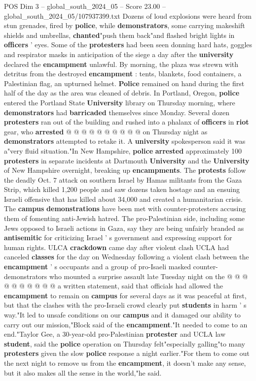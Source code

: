 \begin{textsample}{POS Dim 3 – global\_south\_2024\_05 – Score 23.00 – global\_south\_2024\_05/107937399.txt}
Dozens of loud explosions were heard from stun grenades, fired by \textbf{police}, while \textbf{demonstrators}, some carrying makeshift shields and umbrellas, \textbf{chanted}"push them back"and flashed bright lights in \textbf{officers} ' eyes.
Some of the \textbf{protesters} had been seen donning hard hats, goggles and respirator masks in anticipation of the siege a day after the \textbf{university} declared the \textbf{encampment} unlawful.
By morning, the plaza was strewn with detritus from the destroyed \textbf{encampment} : tents, blankets, food containers, a Palestinian flag, an upturned helmet. \textbf{Police} remained on hand during the first half of the day as the area was cleaned of debris.
In Portland, Oregon, \textbf{police} entered the Portland State \textbf{University} library on Thursday morning, where \textbf{demonstrators} had \textbf{barricaded} themselves since Monday.
Several dozen \textbf{protesters} ran out of the building and rushed into a phalanx of \textbf{officers} in \textbf{riot} gear, who \textbf{arrested} @ @ @ @ @ @ @ @ @ @ on Thursday night as \textbf{demonstrators} attempted to retake it.
A \textbf{university} spokesperson said it was a"very fluid situation."In New Hampshire, \textbf{police} \textbf{arrested} approximately 100 \textbf{protesters} in separate incidents at Dartmouth \textbf{University} and the \textbf{University} of New Hampshire overnight, breaking up \textbf{encampments}.
The \textbf{protests} follow the deadly Oct. 7 attack on southern Israel by Hamas militants from the Gaza Strip, which killed 1,200 people and saw dozens taken hostage and an ensuing Israeli offensive that has killed about 34,000 and created a humanitarian crisis.
The \textbf{campus} \textbf{demonstrations} have been met with counter-protesters accusing them of fomenting anti-Jewish hatred.
The pro-Palestinian side, including some Jews opposed to Israeli actions in Gaza, say they are being unfairly branded as \textbf{antisemitic} for criticizing Israel ' s government and expressing support for human rights.
ULCA \textbf{crackdown} came day after violent clash UCLA had canceled \textbf{classes} for the day on Wednesday following a violent clash between the \textbf{encampment} ' s occupants and a group of pro-Isaeli masked counter-demonstrators who mounted a surprise assault late Tuesday night on the @ @ @ @ @ @ @ @ @ @ a written statement, said that officials had allowed the \textbf{encampment} to remain on \textbf{campus} for several days as it was peaceful at first, but that the clashes with the pro-Israeli crowd clearly put \textbf{students} in harm ' s way."It led to unsafe conditions on our \textbf{campus} and it damaged our ability to carry out our mission,"Block said of the \textbf{encampment}."It needed to come to an end."Taylor Gee, a 30-year-old pro-Palestinian \textbf{protester} and UCLA law \textbf{student}, said the \textbf{police} operation on Thursday felt"especially galling"to many \textbf{protesters} given the slow \textbf{police} response a night earlier."For them to come out the next night to remove us from the \textbf{encampment}, it doesn't make any sense, but it also makes all the sense in the world,"he said.

\end{textsample}

